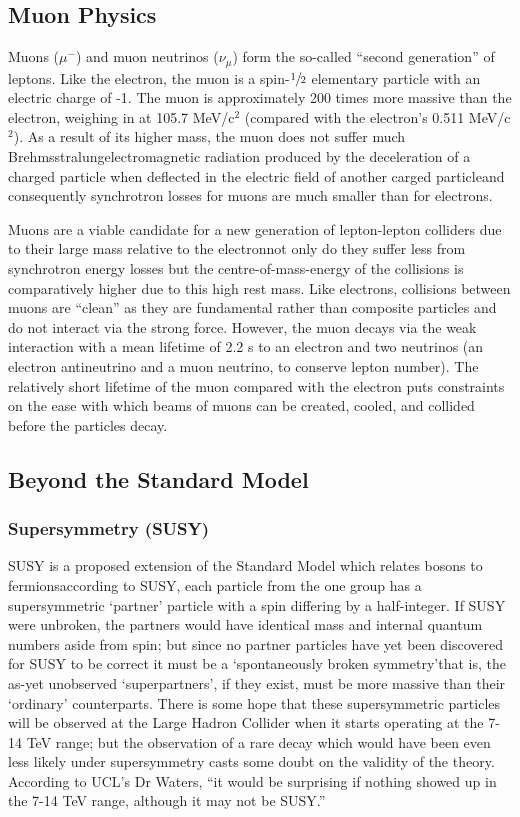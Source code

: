 \subsection{Muon Physics}
Muons ($\mu^{-}$) and muon neutrinos ($\nu_{\mu}$) form the so-called ``second generation'' of leptons. Like the electron, the muon is a spin-$\sfrac{1}{2}$ elementary particle with an electric charge of -1. The muon is approximately 200 times more massive than the electron, weighing in at 105.7 MeV/c$^{2}$ (compared with the electron's 0.511 MeV/c$^{2}$). As a result of its higher mass, the muon does not suffer much Brehmsstralung\textemdash electromagnetic radiation produced by the deceleration of a charged particle when deflected in the electric field of another carged particle\textemdash and consequently synchrotron losses for muons are much smaller than for electrons.

Muons are a viable candidate for a new generation of lepton-lepton colliders due to their large mass relative to the electron\textemdash not only do they suffer less from synchrotron energy losses but the centre-of-mass-energy of the collisions is comparatively higher due to this high rest mass. Like electrons, collisions between muons are ``clean'' as they are fundamental rather than composite particles and do not interact via the strong force. However,  the muon decays via the weak interaction with a mean lifetime of 2.2 \textmu s to an electron and two neutrinos (an electron antineutrino and a muon neutrino, to conserve lepton number). The relatively short lifetime of the muon compared with the electron puts constraints on the ease with which beams of muons can be created, cooled, and collided before the particles decay.

\subsection{Beyond the Standard Model}
\subsubsection{Supersymmetry (SUSY)}
SUSY is a proposed extension of the Standard Model which relates bosons to fermions\textemdash according to SUSY, each particle from the one group has a supersymmetric ‘partner' particle with a spin differing by a half-integer. If SUSY were unbroken, the partners would have identical mass and internal quantum numbers aside from spin; but since no partner particles have yet been discovered for SUSY to be correct it must be a ‘spontaneously broken symmetry'\textemdash that is, the as-yet unobserved ‘superpartners', if they exist, must be more massive than their ‘ordinary' counterparts\cite{CERN:Supersymmetry}. There is some hope that these supersymmetric particles will be observed at the Large Hadron Collider when it starts operating at the 7-14 TeV range; but the observation of a rare decay which would have been even less likely under supersymmetry casts some doubt on the validity of the theory\cite{BBC:SUSY}. According to UCL's Dr Waters, ``it would be surprising if nothing showed up in the 7-14 TeV range, although it may not be SUSY.''\cite{Waters:Interview}

